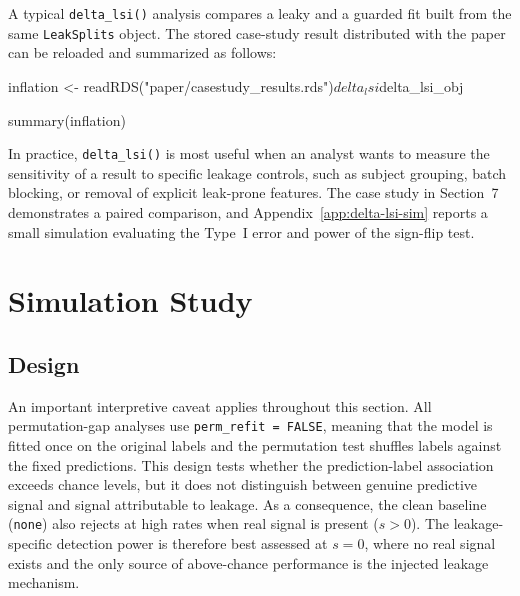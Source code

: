 \documentclass[article]{jss}
\begin{document}
A typical \texttt{delta\_lsi()} analysis compares a leaky and a guarded fit
built from the same \texttt{LeakSplits} object. The stored case-study result
distributed with the paper can be reloaded and summarized as follows:

\begin{CodeInput}
inflation <- readRDS("paper/casestudy_results.rds")$delta_lsi$delta_lsi_obj

summary(inflation)
\end{CodeInput}


\noindent
In practice, \texttt{delta\_lsi()} is most useful when an analyst wants to
measure the sensitivity of a result to specific leakage controls, such as
subject grouping, batch blocking, or removal of explicit leak-prone features.
The case study in Section~7 demonstrates a paired comparison, and
Appendix~\ref{app:delta-lsi-sim} reports a small simulation evaluating the
Type~I error and power of the sign-flip test.

\section{Simulation Study}

\subsection{Design}

An important interpretive caveat applies throughout this section. All
permutation-gap analyses use \texttt{perm\_refit = FALSE}, meaning that the
model is fitted once on the original labels and the permutation test shuffles
labels against the fixed predictions. This design tests whether the
prediction-label association exceeds chance levels, but it does not
distinguish between genuine predictive signal and signal attributable to
leakage. As a consequence, the clean baseline (\texttt{none}) also rejects at
high rates when real signal is present ($s > 0$). The leakage-specific
detection power is therefore best assessed at $s = 0$, where no real signal
exists and the only source of above-chance performance is the injected
leakage mechanism.
\end{document}
